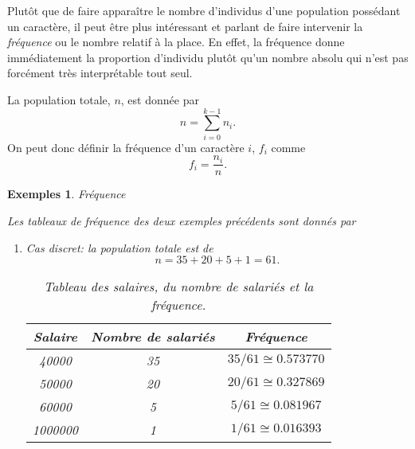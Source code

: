 \documentclass[a4paper,12pt]{book}
\newtheorem*{exemples}{Exemples}
\begin{document}
Plutôt que de faire apparaître le nombre d'individus d'une population 
possédant un caractère, il peut être plus intéressant et parlant de faire intervenir 
la \textit{fréquence} ou le nombre relatif à la place. En effet, la fréquence donne 
immédiatement la proportion d'individu plutôt qu'un nombre absolu qui n'est pas forcément 
très interprétable tout seul. 

La population totale, $n$, est donnée par
\begin{equation}
 n=\sum_{i=0}^{k-1}n_i.
\end{equation}
On peut donc définir la fréquence d'un caractère $i$, $f_i$ comme
\begin{equation}
 f_i=\frac{n_i}{n}.
\end{equation}
\begin{exemples}{Fréquence}

Les tableaux de fréquence des deux exemples précédents sont donnés par
 \begin{enumerate}
  \item Cas discret: la population totale est de 
  \begin{equation}
   n=35+20+5+1=61.
  \end{equation}
  \begin{table}[htp]
  \begin{center}
  \begin{tabular}{|c|c|c|}
  \hline
  Salaire & Nombre de salariés & Fréquence\\
  \hline\hline
  40000 & 35 & $35/61\cong0.573770$\\
  \hline
  50000 & 20 & $20/61\cong0.327869$\\
  \hline
  60000 & 5 & $5/61\cong0.081967$ \\
  \hline
  1000000 & 1 & $1/61\cong0.016393$ \\
  \hline
  \end{tabular}
  \end{center}
  \caption{Tableau des salaires, du nombre de salariés et la fréquence.}
  \end{table}


\end{enumerate}
\end{exemples}
\end{document}
